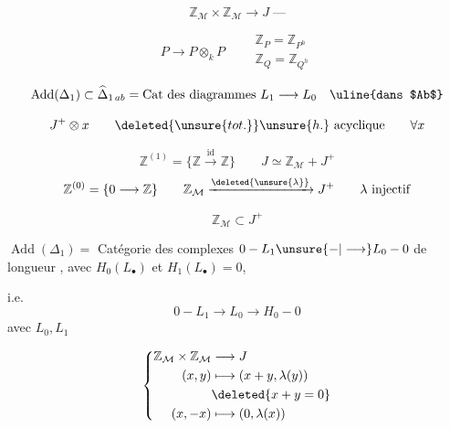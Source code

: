 \[
\mathbb Z_{\mathcal M}\times\mathbb Z_{\mathcal M}\longrightarrow J\;\text{---}
\]

\[
P\longrightarrow P\otimes_kP
\qquad
\begin{gathered}
\mathbb Z_P=\mathbb Z_{P^h}\\
\mathbb Z_Q=\mathbb Z_{Q^h}
\end{gathered}
\]



\[
\operatorname{Add}(\Delta_1)\subset\widehat\Delta_{1\,ab}
=\text{Cat des diagrammes }L_1\longrightarrow L_0\quad\text{\uline{dans $Ab$}}
\]

\[
J^+\otimes x\qquad\deleted{\unsure{tot.}}\unsure{h.}\ \text{acyclique}
\qquad\forall x
\]

\[
\mathbb Z^{(1)}=\{\mathbb Z\xrightarrow{\mathrm{id}}\mathbb Z\}
\qquad
J\simeq\mathbb Z_{\mathcal M}+J^+
\]
\[
\mathbb Z^{(0)}=\{0\longrightarrow\mathbb Z\}
\qquad
\mathbb Z_{\mathcal M}\xrightarrow{\deleted{\unsure{\lambda}}}J^+
\qquad\lambda\ \text{injectif}
\]

\[
\mathbb Z_{\mathcal M}\subset J^+
\]

\noindent
$\operatorname{Add}(\Delta_1)=$ Catégorie des complexes
$0\mathbin{-}L_1\unsure{\mathbin{-}|\longrightarrow}L_0\mathbin{-}0$
de longueur , avec
$H_0(L_\bullet)$ 
et $H_1(L_\bullet)=0$,

\noindent i.e.
\[
0\mathbin{-}L_1\longrightarrow L_0\longrightarrow H_0\mathbin{-}0
\]
avec $L_0,L_1$

\[
\left\{\begin{aligned}
\mathbb Z_{\mathcal M}\times\mathbb Z_{\mathcal M}&\longrightarrow J\\
(x,y)&\longmapsto(x+y,\lambda(y))\\
&\deleted{x+y=0}\\
(x,-x)&\longmapsto(0,\lambda(x))
\end{aligned}\right.
\]

